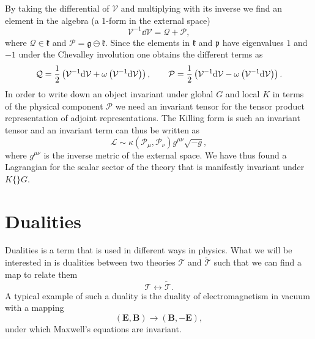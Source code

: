 By taking the differential of $\mathcal{V}$ and multiplying with its inverse we find an element in the algebra (a 1-form in the external space)
\begin{equation}
    \mathcal{V}^{-1}\dd \mathcal{V} = \mathcal{Q}+\mathcal{P},
\end{equation}
where $\mathcal{Q}\in\mathfrak{k}$ and $\mathcal{P}=\mathfrak{g}\ominus\mathfrak{k}$. Since the elements in $\mathfrak{k}$ and $\mathfrak{p}$ have eigenvalues $1$ and $-1$ under the Chevalley involution one obtains the different terms as
\begin{equation}
    \mathcal{Q} = \frac{1}{2}\left(\mathcal{V}^{-1}\mathrm{d} \mathcal{V}+\omega\left(\mathcal{V}^{-1}\mathrm{d} \mathcal{V}\right)\right),\\\qquad \mathcal{P} = \frac{1}{2}\left(\mathcal{V}^{-1}\mathrm{d} \mathcal{V}-\omega\left(\mathcal{V}^{-1}\mathrm{d} \mathcal{V}\right)\right).
\end{equation}
In order to write down an object invariant under global $G$ and local $K$ in terms of the physical component $\mathcal{P}$ we need an invariant tensor for the tensor product representation of adjoint representations. The Killing form is such an invariant tensor and an invariant term can thus be written as 
\begin{equation}
    \mathcal{L} \sim \kappa(\mathcal{P}_\mu,\mathcal{P}_\nu)g^{\mu\nu}\sqrt{-g},
\end{equation}
where $g^{\mu\nu}$ is the inverse metric of the external space. We have thus found a Lagrangian for the scalar sector of the theory that is manifestly invariant under $K\{\}G$. 


\section{Dualities}\label{sec:Dualities}
Dualities is a term that is used in different ways in physics. What we will be interested in is dualities between two theories $\mathscr{T}$ and $\tilde{\mathscr{T}}$ such that we can find a map to relate them 
\begin{equation}
    \mathscr{T} \leftrightarrow \mathscr{\tilde{T}}.
\end{equation}
A typical example of such a duality is the duality of electromagnetism in vacuum with a mapping 
\begin{equation}
    \left(\mathbf{E},\mathbf{B}\right) \to \left(\mathbf{B},-\mathbf{E}\right),
\end{equation}
under which Maxwell's equations are invariant. 

